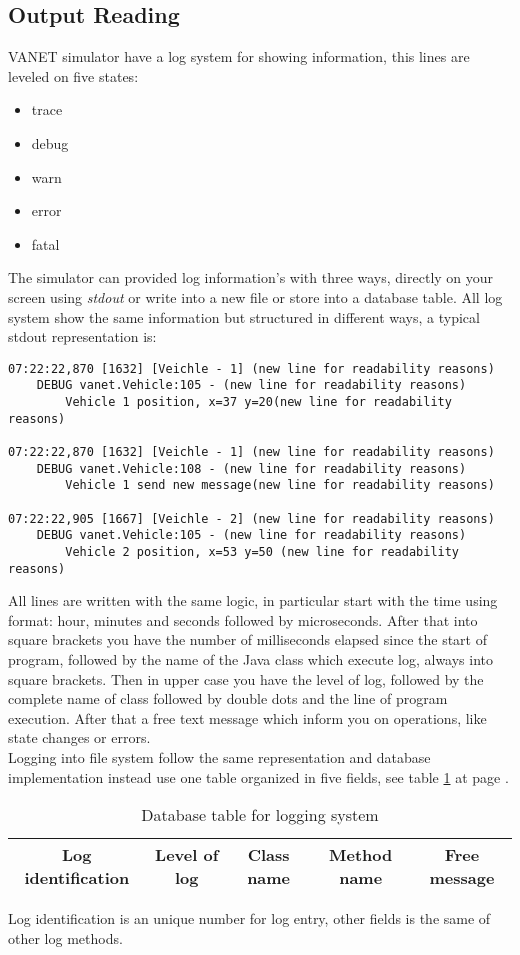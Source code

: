 \subsection{Output Reading}
VANET simulator have a log system for showing information, this lines are leveled on five states:
\begin{itemize}
	\item trace
	\item debug
	\item warn
	\item error
	\item fatal
\end{itemize}
The simulator can provided log  information's with three ways, directly on your screen using \textit{stdout} or write into a new file or store into a database table. All log system show the same information but structured in different ways, a typical stdout representation is:
\begin{verbatim}
07:22:22,870 [1632] [Veichle - 1] (new line for readability reasons)
	DEBUG vanet.Vehicle:105 - (new line for readability reasons)
		Vehicle 1 position, x=37 y=20(new line for readability reasons)
		
07:22:22,870 [1632] [Veichle - 1] (new line for readability reasons)
	DEBUG vanet.Vehicle:108 - (new line for readability reasons)
		Vehicle 1 send new message(new line for readability reasons)
		
07:22:22,905 [1667] [Veichle - 2] (new line for readability reasons)
	DEBUG vanet.Vehicle:105 - (new line for readability reasons)
		Vehicle 2 position, x=53 y=50 (new line for readability reasons)
\end{verbatim}
All lines are written with the same logic, in particular start with the time using format: hour, minutes and seconds followed by microseconds. After that into square brackets you have the number of milliseconds elapsed since the start of program, followed by the name of the Java class which execute log, always into square brackets. Then in upper case you have the level of log, followed by the complete name of class followed by double dots and the line of program execution. After that a free text message which inform you on operations, like state changes or errors.\\
Logging into file system follow the same representation and database implementation instead use one table organized in five fields, see table \ref{tab:DBLog} at page \pageref{tab:DBLog}.
\begin{table}[!ht]
	\centering
	\caption{Database table for logging system}
	\begin{tabular}{|c|c|c|c|c|}
	\hline\hline 
	\textbf{Log identification} & \textbf{Level of log} & \textbf{Class name} & \textbf{Method name} & \textbf{Free message}\\
	\hline
	\hline     %
 	\end{tabular} 
	\label{tab:DBLog}
\end{table}
Log identification is an unique number for log entry, other fields is the same of other log methods.
